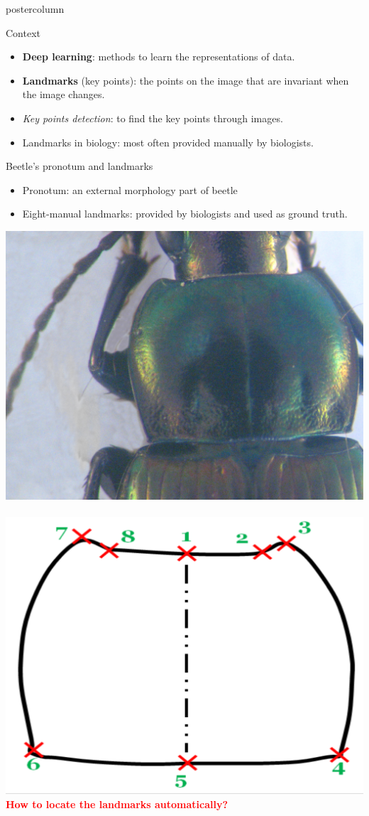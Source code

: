 \begin{frame}
  \begin{columns}
    \begin{column}{.53\textwidth}
      \begin{beamercolorbox}[center,wd=\textwidth]{postercolumn}
        \begin{minipage}[T]{.95\textwidth}
          \parbox[t][\columnheight]{\textwidth}{
            \begin{block}{Context}
            	\begin{itemize}
            		\item \textbf{Deep learning}\cite{lecun2015deep}: methods to learn the representations of data.
            		\item \textbf{Landmarks} (key points): the points on the image that are invariant when the image changes.
             		\item \textit{Key points detection}: to find the key points through images.
             		\item Landmarks in biology: most often provided manually by biologists.
            	\end{itemize}
            \end{block}
            
            \vfill            
            \begin{block}{Beetle's pronotum and landmarks}
            \begin{itemize}
            	\item Pronotum: an external morphology part of beetle
            	\item Eight-manual landmarks: provided by biologists and used as ground truth.
            \end{itemize}
            \centering
            
            \includegraphics[width=.35\textwidth]{images/pronotum.JPG}~~
            \includegraphics[width=.35\textwidth]{images/pronotum.png}            \\[0.2cm]
            \textbf{\textcolor{red}{How to locate the landmarks automatically?}}
            \end{block}
            
}
\end{minipage}
\end{beamercolorbox}
\end{column}
\end{columns}
\end{frame}
